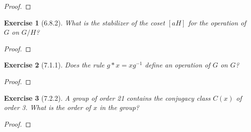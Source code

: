 \documentclass[12pt]{article}
\newtheorem*{exer}{Exercise}
\begin{document}
\begin{proof}

\end{proof}


\begin{exer}[6.8.2]
    What is the stabilizer of the coset $[aH]$ for the operation of $G$
    on $G/H$?
\end{exer}

\begin{proof}

\end{proof}


\begin{exer}[7.1.1]
    Does the rule $g * x = x g^{-1}$ define an operation of $G$ on $G$?
\end{exer}

\begin{proof}

\end{proof}


\begin{exer}[7.2.2]
    A group of order 21 contains the conjugacy class $C(x)$ of order 3.
    What is the order of $x$ in the group?
\end{exer}

\begin{proof}

\end{proof}
\end{document}
